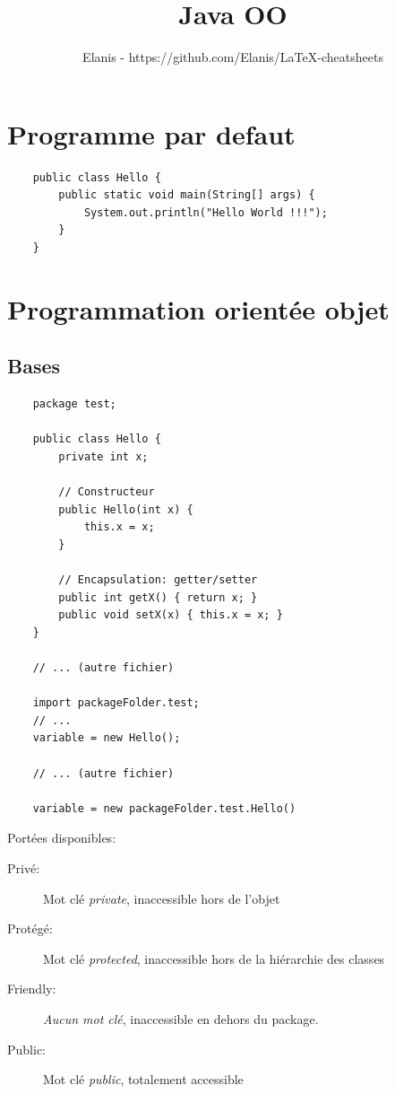 \documentclass[a4paper, 12pt, french]{article}
\title{Java OO}
\author{Elanis - https://github.com/Elanis/LaTeX-cheatsheets}
\date{}
\begin{document}
	\maketitle

	\section{Programme par defaut}

	\begin{lstlisting}
	public class Hello {
		public static void main(String[] args) {
			System.out.println("Hello World !!!");
		}
	}
	\end{lstlisting}

	\section{Programmation orientée objet}
	\subsection{Bases}

	\begin{lstlisting}
	package test;

	public class Hello {
		private int x;

		// Constructeur
		public Hello(int x) {
			this.x = x;
		}

		// Encapsulation: getter/setter
		public int getX() { return x; }
		public void setX(x) { this.x = x; }
	}

	// ... (autre fichier)

	import packageFolder.test;
	// ...
	variable = new Hello();

	// ... (autre fichier)

	variable = new packageFolder.test.Hello()
	\end{lstlisting}

	Portées disponibles:
	\begin{description}
		\item[Privé:] Mot clé \emph{private}, inaccessible hors de l'objet
		\item[Protégé:] Mot clé \emph{protected}, inaccessible hors de la hiérarchie des classes
		\item[Friendly:] \emph{Aucun mot clé}, inaccessible en dehors du package.
		\item[Public:] Mot clé \emph{public}, totalement accessible
	\end{description}
\end{document}
